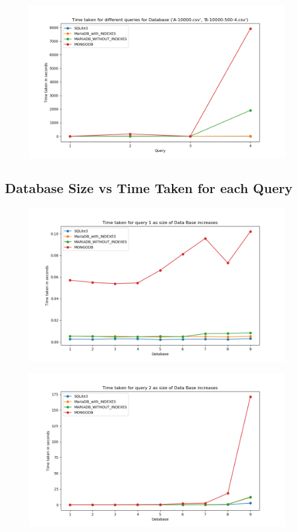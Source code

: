 \documentclass[12pt]{article}
\begin{document}
\begin{figure}[H]
  \centering
  \includegraphics[width=.95\linewidth]{db_qry_time/9.png}
\end{figure}

\subsection{Database Size vs Time Taken for each Query}
\begin{figure}[H]
  \centering
  \includegraphics[width=.95\linewidth]{db_size_time/1.png}
\end{figure}

\begin{figure}[H]
  \centering
  \includegraphics[width=.95\linewidth]{db_size_time/2.png}
\end{figure}
\end{document}
